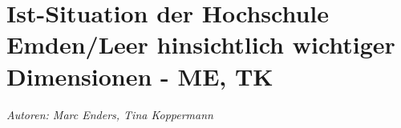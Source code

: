 \chapter{Ist-Situation der Hochschule Emden/Leer hinsichtlich wichtiger Dimensionen - ME, TK}

\textit{Autoren: Marc Enders, Tina Koppermann}







